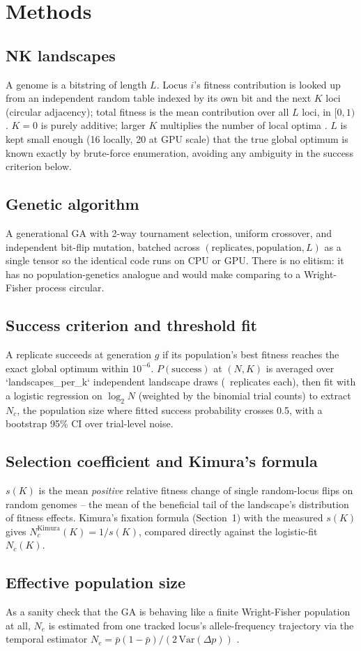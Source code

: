 \section{Methods}

\subsection{NK landscapes}
A genome is a bitstring of length $L$. Locus $i$'s fitness contribution is
looked up from an independent random table indexed by its own bit and the
next $K$ loci (circular adjacency); total fitness is the mean contribution
over all $L$ loci, in $[0,1)$. $K=0$ is purely additive; larger $K$
multiplies the number of local optima \cite{kauffman1987towards}. $L$ is
kept small enough (16 locally, 20 at GPU scale) that the true global
optimum is known exactly by brute-force enumeration, avoiding any
ambiguity in the success criterion below.

\subsection{Genetic algorithm}
A generational GA with 2-way tournament selection, uniform crossover, and
independent bit-flip mutation, batched across $(\text{replicates},
\text{population}, L)$ as a single tensor so the identical code runs on
CPU or GPU. There is no elitism: it has no population-genetics analogue
and would make comparing to a Wright-Fisher process circular.

\subsection{Success criterion and threshold fit}
A replicate succeeds at generation $g$ if its population's best fitness
reaches the exact global optimum within $10^{-6}$. $P(\text{success})$ at
$(N,K)$ is averaged over `landscapes\_per\_k` independent landscape draws
(\SweepReplicates\ replicates each), then fit with a logistic regression on
$\log_2 N$ (weighted by the binomial trial counts) to extract $N_c$, the
population size where fitted success probability crosses 0.5, with a
bootstrap 95\% CI over trial-level noise.

\subsection{Selection coefficient and Kimura's formula}
$s(K)$ is the mean \emph{positive} relative fitness change of single
random-locus flips on random genomes -- the mean of the beneficial tail of
the landscape's distribution of fitness effects. Kimura's fixation formula
(Section~1) with the measured $s(K)$ gives $N_c^{\text{Kimura}}(K) =
1/s(K)$, compared directly against the logistic-fit $N_c(K)$.

\subsection{Effective population size}
As a sanity check that the GA is behaving like a finite Wright-Fisher
population at all, $N_e$ is estimated from one tracked locus's
allele-frequency trajectory via the temporal estimator $N_e = \bar
p(1-\bar p)/(2\,\mathrm{Var}(\Delta p))$
\cite{krimbas1971drift,waples1989temporal}.
